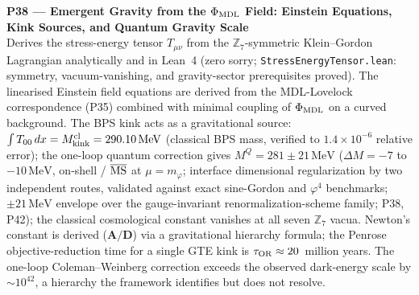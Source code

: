 \documentclass[11pt]{article}
\newcommand{\lean}[1]{%
  \penalty-100
  \begingroup\def\_{{\textunderscore\allowbreak}}\texttt{#1}\endgroup}
\newcommand{\CatAD}{\textbf{A/D}}
\begin{document}
\medskip
\noindent\textbf{P38 — Emergent Gravity from the $\Phi_{\rm MDL}$ Field:
Einstein Equations, Kink Sources, and Quantum Gravity Scale}~\cite{SpivackPhiMDLGravity}\\
Derives the stress-energy tensor $T_{\mu\nu}$ from the $\mathbb{Z}_7$-symmetric
Klein--Gordon Lagrangian analytically and in Lean~4 (zero sorry;
\lean{StressEnergyTensor.lean}: symmetry, vacuum-vanishing, and gravity-sector
prerequisites proved).  The linearised Einstein field equations are derived from
the MDL-Lovelock correspondence (P35) combined with minimal coupling of
$\Phi_{\rm MDL}$ on a curved background.  The BPS kink acts as a gravitational
source: $\int T_{00}\,dx = M_{\rm kink}^{\rm cl} = 290.10\,\mathrm{MeV}$ (classical BPS mass,
verified to $1.4\times10^{-6}$ relative error); the one-loop quantum correction gives
$M^Q = 281 \pm 21\,\mathrm{MeV}$ ($\Delta M = -7$ to $-10\,\mathrm{MeV}$, on-shell /
$\overline{\rm MS}$ at $\mu = m_\varphi$; interface dimensional regularization by two
independent routes, validated against exact sine-Gordon and $\varphi^4$ benchmarks;
$\pm21\,\mathrm{MeV}$ envelope over the gauge-invariant renormalization-scheme family;
P38, P42); the classical cosmological constant vanishes
at all seven $\mathbb{Z}_7$ vacua.  Newton's constant is derived ($\CatAD$) via
a gravitational hierarchy formula; the Penrose objective-reduction time for a
single GTE kink is $\tau_{\rm OR}\approx 20$~million years.  The one-loop
Coleman--Weinberg correction exceeds the observed dark-energy scale by
${\sim}10^{42}$, a hierarchy the framework identifies but does not resolve.
\end{document}
